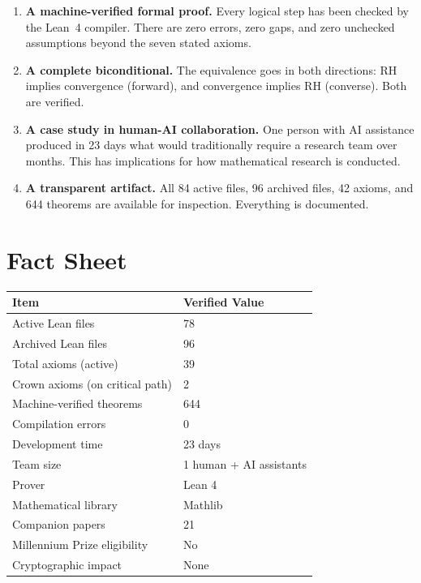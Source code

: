 \documentclass[11pt,a4paper]{article}
\begin{document}
\begin{enumerate}
  \item \textcolor{correct}{\textbf{A machine-verified formal
    proof.}} Every logical step has been checked by the Lean~4
    compiler. There are zero errors, zero gaps, and zero
    unchecked assumptions beyond the seven stated axioms.

  \item \textcolor{correct}{\textbf{A complete biconditional.}}
    The equivalence goes in both directions: RH implies convergence
    (forward), and convergence implies RH (converse). Both are
    verified.

  \item \textcolor{correct}{\textbf{A case study in human-AI
    collaboration.}} One person with AI assistance produced in
    23 days what would traditionally require a research team over
    months. This has implications for how mathematical research
    is conducted.

  \item \textcolor{correct}{\textbf{A transparent artifact.}}
    All 84 active files, 96 archived files, 42 axioms, and 644
    theorems are available for inspection. Everything is
    documented.
\end{enumerate}

\section{Fact Sheet}

\begin{center}
\begin{tabular}{@{}ll@{}}
\toprule
\textbf{Item} & \textbf{Verified Value} \\
\midrule
Active Lean files & 78 \\
Archived Lean files & 96 \\
Total axioms (active) & 39 \\
Crown axioms (on critical path) & 2 \\
Machine-verified theorems & 644 \\
Compilation errors & 0 \\
Development time & 23 days \\
Team size & 1 human + AI assistants \\
Prover & Lean 4 \\
Mathematical library & Mathlib \\
Companion papers & 21 \\
Millennium Prize eligibility & No \\
Cryptographic impact & None \\
\bottomrule
\end{tabular}
\end{center}
\end{document}
